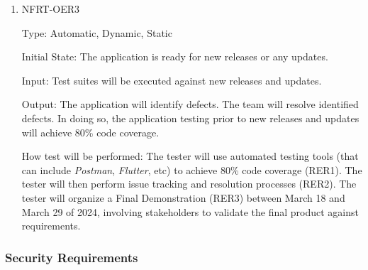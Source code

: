 \documentclass[12pt, titlepage]{article}
\begin{document}
\begin{enumerate}
\item{NFRT-OER3\\}

Type: Automatic, Dynamic, Static

Initial State: The application is ready for new releases or any updates.
                
Input: Test suites will be executed against new releases and updates.
                
Output: The application will identify defects. The team will resolve identified defects. In doing so, the application testing prior to new releases and updates will achieve 80\% code coverage.
                
How test will be performed: The tester will use automated testing tools (that can include \textit{Postman}, \textit{Flutter}, etc) to achieve 80\% code coverage (RER1). The tester will then perform issue tracking and resolution processes (RER2). The tester will organize a Final Demonstration (RER3) between March 18 and March 29 of 2024, involving stakeholders to validate the final product against requirements.

\end{enumerate}

\subsubsection{Security Requirements}
\end{document}
